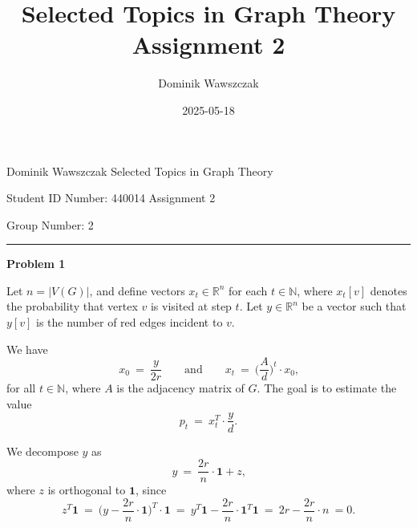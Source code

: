 \documentclass[12pt]{article}
\title{Selected Topics in Graph Theory Assignment 2}
\author{Dominik Wawszczak}
\date{2025-05-18}
\begin{document}
	\setlength{\parindent}{0 cm}
	
	Dominik Wawszczak \hfill Selected Topics in Graph Theory
	
	Student ID Number: 440014 \hfill Assignment 2
	
	Group Number: 2
	
	\bigskip
	\hrule
	\bigskip
	
	\textbf{Problem 1}
	
	\medskip
	
	Let \(n = |V(G)|\), and define vectors \(x_{t} \in \mathbb{R}^{n}\) for each
	\(t \in \mathbb{N}\), where \(x_{t}[v]\) denotes the probability that vertex
	\(v\) is visited at step \(t\). Let \(y \in \mathbb{R}^{n}\) be a vector
	such that \(y[v]\) is the number of red edges incident to \(v\).
	
	\medskip
	
	We have
	\[
		x_{0} \ = \ \frac{y}{2 r} \qquad \text{and} \qquad x_{t} \ = \ \bigg(
		\frac{A}{d} \bigg)^{t} \cdot x_{0} \text{,}
	\]
	for all \(t \in \mathbb{N}\), where \(A\) is the adjacency matrix of \(G\).
	The goal is to estimate the value
	\[
		p_{t} \ = \ x_{t}^{T} \cdot \frac{y}{d} \text{.}
	\]
	
	\medskip
	
	We decompose \(y\) as
	\[
		y \ = \ \frac{2 r}{n} \cdot \mathbf{1} + z \text{,}
	\]
	where \(z\) is orthogonal to \(\mathbf{1}\), since
	\[
		z^{T} \mathbf{1} \ = \ \bigg( y - \frac{2 r}{n} \cdot \mathbf{1}
		\bigg)^{T} \cdot \mathbf{1} \ = \ y^{T} \mathbf{1} - \frac{2 r}{n} \cdot
		\mathbf{1}^{T} \mathbf{1} \ = \ 2 r - \frac{2 r}{n} \cdot n \ = 0
		\text{.}
	\]
	
	\medskip
	
\end{document}
